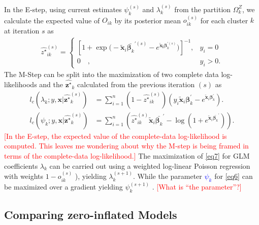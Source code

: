 \documentclass[11pt,letterpaper]{article}
\numberwithin{equation}{section}
\numberwithin{equation}{section}
\numberwithin{equation}{section}
\newcommand{\xTilda}{\tilde{\bm{x}}}
\newcommand{\zz}{z^\star}
\begin{document}
In the E-step, using current estimates $\psi_k^{(s)}$ and $ \lambda_k^{(s)} $ from the partition $ \Omega^Z_{k}$, we calculate the expected value of ${O_{ik}}$ by its posterior mean ${o_{ik}^{(s)}}$ for each cluster $k$ at iteration $s$ as
\begin{align*}
{\hat{\zz}}_{ik}^{(s)} = \begin{cases}  \left[ 1 + \exp{\big(-\xTilda_i \bar{\bm{\beta}_k}^{'(s)} - e^ {\bm{\xTilda_i} \bm{\beta}_k^{'(s)}} \big) } \right]^{-1}, &  y_{i} = 0 \\
  0 \quad , & y_{i}> 0 .
\end{cases}
\end{align*}
%
The M-Step can be split into the maximization of two complete data log-likelihoods and the $\hat{\bm{\zz}}_k$ calculated from the previous iteration $(s)$ as
\begin{align}
 l_c(\lambda_k; y,\bm{x}| \hat{\bm{\zz}}_k^{(s)}) &= \sum_{i=1}^n (1- \hat{\zz}_{ik}^{(s)}) (y_i \xTilda_i \bm{\beta}_k^{'}  - e^{\xTilda_i \bm{\beta}_k^{'}})\label{eq7}.\\
l_c(\psi_k;y,\bm{x}|\hat{\bm{\zz}}_k^{(s)}) &=\sum_{i=1}^n \left( \hat{\zz}_{ik}^{(s)} \xTilda_i \bar{\bm{\beta}_k }^{'} - \log \left(1+ e^{ \xTilda_i \bar{\bm{\beta}_k }^{'}} \right) \right). \label{eq6}   
 \end{align}
\textcolor{red}{[In the E-step, the expected value of the complete-data log-likelihood is computed. This leaves me wondering about why the M-step is being framed in terms of the complete-data log-likelihood.]}
The maximization of \eqref{eq7} for GLM coefficients $\lambda_k$ can be carried out using a weighted log-linear Poisson regression with weights $1 - o_{ik}^{(s)}$ \citep[see][]{McCullaghNelder1989}), yielding $\lambda_k^{(s+1)}$.
While the parameter \textcolor{blue}{ $\psi_k$ }for \eqref{eq6} can be maximized over a gradient yielding $\psi_k^{(s+1)}$ \citep[see][]{Lambert}. \textcolor{red}{[What is ``the parameter''?]}

\subsection{Comparing zero-inflated Models}\label{subsec:: compareZero}
\end{document}
